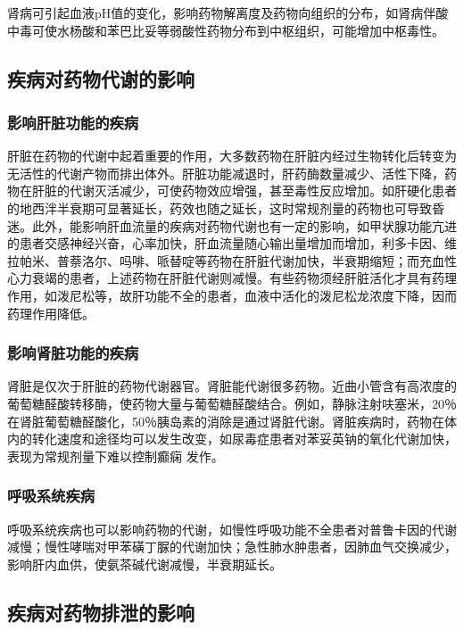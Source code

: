 肾病可引起血液pH值的变化，影响药物解离度及药物向组织的分布，如肾病伴酸中毒可使水杨酸和苯巴比妥等弱酸性药物分布到中枢组织，可能增加中枢毒性。

\subsection{疾病对药物代谢的影响}

\subsubsection{影响肝脏功能的疾病}

肝脏在药物的代谢中起着重要的作用，大多数药物在肝脏内经过生物转化后转变为无活性的代谢产物而排出体外。肝脏功能减退时，肝药酶数量减少、活性下降，药物在肝脏的代谢灭活减少，可使药物效应增强，甚至毒性反应增加。如肝硬化患者的地西泮半衰期可显著延长，药效也随之延长，这时常规剂量的药物也可导致昏迷。此外，能影响肝血流量的疾病对药物代谢也有一定的影响，如甲状腺功能亢进的患者交感神经兴奋，心率加快，肝血流量随心输出量增加而增加，利多卡因、维拉帕米、普萘洛尔、吗啡、哌替啶等药物在肝脏代谢加快，半衰期缩短；而充血性心力衰竭的患者，上述药物在肝脏代谢则减慢。有些药物须经肝脏活化才具有药理作用，如泼尼松等，故肝功能不全的患者，血液中活化的泼尼松龙浓度下降，因而药理作用降低。

\subsubsection{影响肾脏功能的疾病}

肾脏是仅次于肝脏的药物代谢器官。肾脏能代谢很多药物。近曲小管含有高浓度的葡萄糖醛酸转移酶，使药物大量与葡萄糖醛酸结合。例如，静脉注射呋塞米，20％在肾脏葡萄糖醛酸化，50％胰岛素的消除是通过肾脏代谢。肾脏疾病时，药物在体内的转化速度和途径均可以发生改变，如尿毒症患者对苯妥英钠的氧化代谢加快，表现为常规剂量下难以控制癫痫
发作。

\subsubsection{呼吸系统疾病}

呼吸系统疾病也可以影响药物的代谢，如慢性呼吸功能不全患者对普鲁卡因的代谢减慢；慢性哮喘对甲苯磺丁脲的代谢加快；急性肺水肿患者，因肺血气交换减少，影响肝内血供，使氨茶碱代谢减慢，半衰期延长。

\subsection{疾病对药物排泄的影响}

